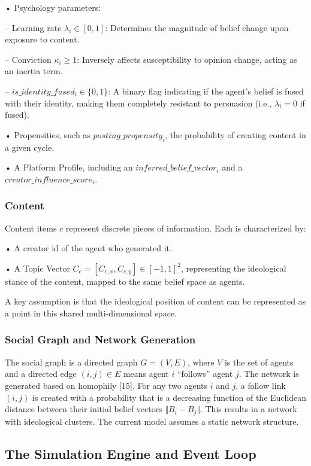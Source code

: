 \documentclass[11pt]{article}
\begin{document}
• Psychology parameters:

– Learning rate $\lambda_i \in [0, 1]$: Determines the magnitude of belief change upon exposure to content.

– Conviction $\kappa_i \geq 1$: Inversely affects susceptibility to opinion change, acting as an inertia term.

– $is\_identity\_fused_i \in \{0, 1\}$: A binary flag indicating if the agent’s belief is fused with their identity, making them completely resistant to persuasion (i.e., $\lambda_i = 0$ if fused).

• Propensities, such as $posting\_propensity_i$, the probability of creating content in a given cycle.

• A Platform Profile, including an $inferred\_belief\_vector_i$ and a $creator\_influence\_score_i$.

\subsubsection{Content}

Content items $c$ represent discrete pieces of information. Each is characterized by:

• A creator id of the agent who generated it.

• A Topic Vector $C_c = [C_{c,x}, C_{c,y}] \in [-1, 1]^2$, representing the ideological stance of the content, mapped to the same belief space as agents.

A key assumption is that the ideological position of content can be represented as a point in this shared multi-dimensional space.

\subsubsection{Social Graph and Network Generation}

The social graph is a directed graph $G = (V, E)$, where $V$ is the set of agents and a directed edge $(i, j) \in E$ means agent $i$ ``follows'' agent $j$. The network is generated based on homophily [15]. For any two agents $i$ and $j$, a follow link $(i, j)$ is created with a probability that is a decreasing function of the Euclidean distance between their initial belief vectors $\Vert B_i - B_j \Vert$. This results in a network with ideological clusters. The current model assumes a static network structure.

\subsection{The Simulation Engine and Event Loop}
\end{document}
